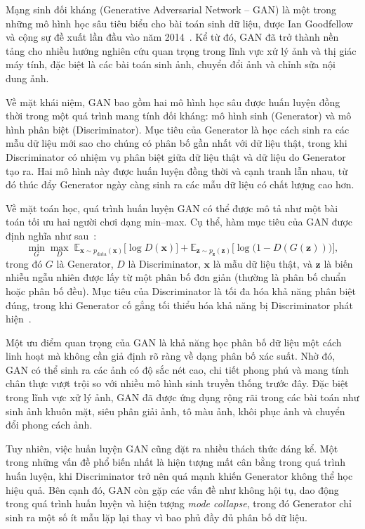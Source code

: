 \documentclass[../DoAn.tex]{subfiles}
\begin{document}
Mạng sinh đối kháng (Generative Adversarial Network -- GAN) là một trong những mô hình học sâu tiêu biểu cho bài toán sinh dữ liệu, được Ian Goodfellow và cộng sự đề xuất lần đầu vào năm 2014~\cite{goodfellow2014generative}. Kể từ đó, GAN đã trở thành nền tảng cho nhiều hướng nghiên cứu quan trọng trong lĩnh vực xử lý ảnh và thị giác máy tính, đặc biệt là các bài toán sinh ảnh, chuyển đổi ảnh và chỉnh sửa nội dung ảnh.

Về mặt khái niệm, GAN bao gồm hai mô hình học sâu được huấn luyện đồng thời trong một quá trình mang tính đối kháng: mô hình sinh (Generator) và mô hình phân biệt (Discriminator). Mục tiêu của Generator là học cách sinh ra các mẫu dữ liệu mới sao cho chúng có phân bố gần nhất với dữ liệu thật, trong khi Discriminator có nhiệm vụ phân biệt giữa dữ liệu thật và dữ liệu do Generator tạo ra. Hai mô hình này được huấn luyện đồng thời và cạnh tranh lẫn nhau, từ đó thúc đẩy Generator ngày càng sinh ra các mẫu dữ liệu có chất lượng cao hơn.

Về mặt toán học, quá trình huấn luyện GAN có thể được mô tả như một bài toán tối ưu hai người chơi dạng min--max. Cụ thể, hàm mục tiêu của GAN được định nghĩa như sau~\cite{goodfellow2014generative}:
\[
\min_{G} \max_{D} \; \mathbb{E}_{\mathbf{x} \sim p_{\text{data}}(\mathbf{x})} \big[\log D(\mathbf{x})\big] 
+ \mathbb{E}_{\mathbf{z} \sim p_{\mathbf{z}}(\mathbf{z})} \big[\log \big(1 - D(G(\mathbf{z}))\big)\big],
\]
trong đó $G$ là Generator, $D$ là Discriminator, $\mathbf{x}$ là mẫu dữ liệu thật, và $\mathbf{z}$ là biến nhiễu ngẫu nhiên được lấy từ một phân bố đơn giản (thường là phân bố chuẩn hoặc phân bố đều). Mục tiêu của Discriminator là tối đa hóa khả năng phân biệt đúng, trong khi Generator cố gắng tối thiểu hóa khả năng bị Discriminator phát hiện~\cite{goodfellow2014generative}.

Một ưu điểm quan trọng của GAN là khả năng học phân bố dữ liệu một cách linh hoạt mà không cần giả định rõ ràng về dạng phân bố xác suất. Nhờ đó, GAN có thể sinh ra các ảnh có độ sắc nét cao, chi tiết phong phú và mang tính chân thực vượt trội so với nhiều mô hình sinh truyền thống trước đây. Đặc biệt trong lĩnh vực xử lý ảnh, GAN đã được ứng dụng rộng rãi trong các bài toán như sinh ảnh khuôn mặt, siêu phân giải ảnh, tô màu ảnh, khôi phục ảnh và chuyển đổi phong cách ảnh.

Tuy nhiên, việc huấn luyện GAN cũng đặt ra nhiều thách thức đáng kể. Một trong những vấn đề phổ biến nhất là hiện tượng mất cân bằng trong quá trình huấn luyện, khi Discriminator trở nên quá mạnh khiến Generator không thể học hiệu quả. Bên cạnh đó, GAN còn gặp các vấn đề như không hội tụ, dao động trong quá trình huấn luyện và hiện tượng \textit{mode collapse}, trong đó Generator chỉ sinh ra một số ít mẫu lặp lại thay vì bao phủ đầy đủ phân bố dữ liệu.
\end{document}

